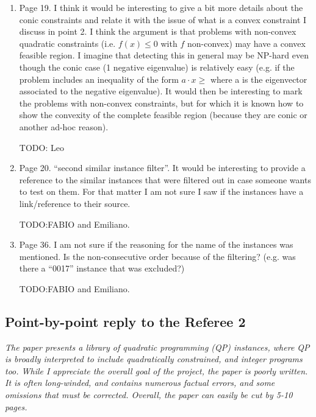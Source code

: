 \documentclass[11pt]{article}
\newcommand{\rep}[1]{{\textcolor{acblue}{#1}}}
\newcommand{\leo}[1]{{\color{red}#1}}
\newcommand{\fabio}[1]{{\color{cyan}#1}}
\begin{document}
{\begin{enumerate}
\item Page 19. I think it would be interesting to give a bit more details about the conic constraints and relate it with the issue of what is a convex
constraint I discuss in point 2. I think the argument is that problems with
non-convex quadratic constraints (i.e. $f (x) \le 0$ with $f$ non-convex) may
have a convex feasible region. I imagine that detecting this in general may
be NP-hard even though the conic case (1 negative eigenvalue) is relatively
easy (e.g. if the problem includes an inequality of the form $a \cdot x \ge$ where
a is the eigenvector associated to the negative eigenvalue). It would then
be interesting to mark the problems with non-convex constraints, but for
which it is known how to show the convexity of the complete feasible
region (because they are conic or another ad-hoc reason).

\rep{TODO: Leo
 }


\item Page 20. ``second similar instance filter''. It would be interesting to provide a reference to the similar instances that were filtered out in case
someone wants to test on them. For that matter I am not sure I saw if
the instances have a link/reference to their source.

\rep{TODO:FABIO and Emiliano.}


\item Page 36. I am not sure if the reasoning for the name of the instances was mentioned. Is the non-consecutive order because of the filtering? (e.g.
was there a ``0017'' instance that was excluded?)

\rep{TODO:FABIO and Emiliano.
}



\end{enumerate}
}



\subsection*{Point-by-point reply to the Referee 2}


{\it
The paper presents a library of quadratic programming (QP) instances, where QP is broadly interpreted
to include quadratically constrained, and integer programs too. While I appreciate the overall goal of
the project, the paper is poorly written. It is often long-winded, and contains numerous factual errors,
and some omissions that must be corrected. Overall, the paper can easily be cut by 5-10 pages.
}
\end{document}
